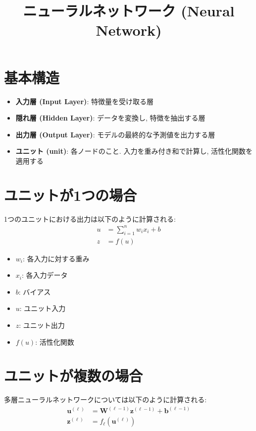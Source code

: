 \documentclass[dvipdfmx, 10pt]{jsarticle}
\title{\textbf{ニューラルネットワーク (Neural Network)}}
\author{}
\date{}
\begin{document}
\maketitle

\section*{基本構造}
\begin{itemize}
    \item \textbf{入力層 (Input Layer)}: 特徴量を受け取る層
    \item \textbf{隠れ層 (Hidden Layer)}: データを変換し, 特徴を抽出する層
    \item \textbf{出力層 (Output Layer)}: モデルの最終的な予測値を出力する層
    \item \textbf{ユニット (unit)}: 各ノードのこと. 入力を重み付き和で計算し, 活性化関数を適用する
\end{itemize}

\section*{ユニットが1つの場合}
1つのユニットにおける出力は以下のように計算される: 
\begin{align*}
    u &= \sum_{i=1}^n w_i x_i + b \\
    z &= f(u)
\end{align*}

\begin{itemize}
    \item $w_i$: 各入力に対する重み
    \item $x_i$: 各入力データ
    \item $b$: バイアス
    \item $u$: ユニット入力
    \item $z$: ユニット出力
    \item $f(u)$: 活性化関数
\end{itemize}

\section*{ユニットが複数の場合}
多層ニューラルネットワークについては以下のように計算される: 
\begin{align*}
    \mathbf{u}^{(\ell)} &= \mathbf{W}^{(\ell-1)} \mathbf{z}^{(\ell-1)} + \mathbf{b}^{(\ell-1)} \\
    \mathbf{z}^{(\ell)} &= f_{\ell}(\mathbf{u}^{(\ell)})
\end{align*}
\end{document}
